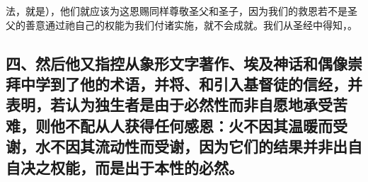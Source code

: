 法，就是），他们就应该为这恩赐同样尊敬圣父和圣子，因为我们的救恩若不是圣父的善意通过祂自己的权能为我们付诸实施，就不会成就。我们从圣经中得知，。\par


\subsection{四、然后他又指控从象形文字著作、埃及神话和偶像崇拜中学到了他的术语，并将、和引入基督徒的信经，并表明，若认为独生者是由于必然性而非自愿地承受苦难，则他不配从人获得任何感恩：火不因其温暖而受谢，水不因其流动性而受谢，因为它们的结果并非出自自决之权能，而是出于本性的必然。}

